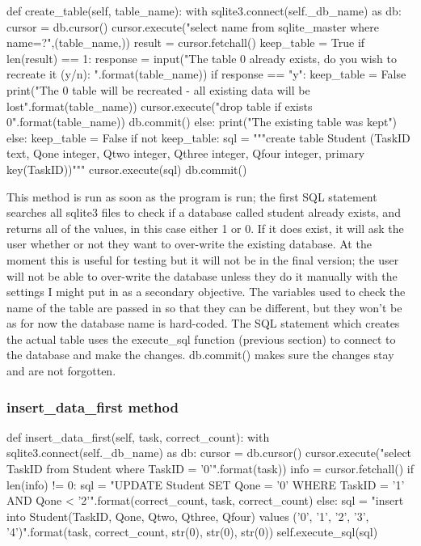 \begin{python}
def create_table(self, table_name):
        with sqlite3.connect(self._db_name) as db:
            cursor = db.cursor()
            cursor.execute("select name from sqlite_master where name=?",(table_name,))
            result = cursor.fetchall()
            keep_table = True
            if len(result) == 1:
                response = input("The table {0} already exists, do you wish to recreate it (y/n): ".format(table_name))
                if response == "y":
                    keep_table = False
                    print("The {0} table will be recreated - all existing data will be lost".format(table_name))
                    cursor.execute("drop table if exists {0}".format(table_name))
                    db.commit()
                else:
                    print("The existing table was kept")
            else:
                keep_table = False
            if not keep_table:
                sql = """create table Student
                (TaskID text,
                Qone integer,
                Qtwo integer,
                Qthree integer,
                Qfour integer,
                primary key(TaskID))"""
                cursor.execute(sql)
                db.commit()
\end{python}

This method is run as soon as the program is run; the first SQL statement searches all sqlite3 files to check if a database called student already exists, and returns all of the values, in this case either 1 or 0. If it does exist, it will ask the user whether or not they want to over-write the existing database. At the moment this is useful for testing but it will not be in the final version; the user will not be able to over-write the database unless they do it manually with the settings I might put in as a secondary objective. The variables used to check the name of the table are passed in so that they can be different, but they won't be as for now the database name is hard-coded. The SQL statement which creates the actual table uses the execute\_sql function (previous section) to connect to the database and make the changes. db.commit() makes sure the changes stay and are not forgotten.

\subsubsection{insert\_data\_first method}

\begin{python}
    def insert_data_first(self, task, correct_count):
        with sqlite3.connect(self._db_name) as db:
            cursor = db.cursor()
            cursor.execute("select TaskID from Student where TaskID = '{0}'".format(task))
            info = cursor.fetchall()
            if len(info) != 0:
                sql = "UPDATE Student SET Qone = '{0}' WHERE TaskID = '{1}' AND Qone < '{2}'".format(correct_count, task, correct_count)
            else:
                sql = "insert into Student(TaskID, Qone, Qtwo, Qthree, Qfour) values ('{0}', '{1}', '{2}', '{3}', '{4}')".format(task, correct_count, str(0), str(0), str(0))
            self.execute_sql(sql)
\end{python}

